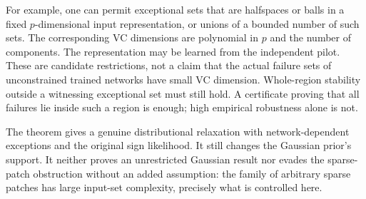 For example, one can permit exceptional sets that are halfspaces or balls
in a fixed $p$-dimensional input representation, or unions of a bounded
number of such sets. The corresponding VC dimensions are polynomial in
$p$ and the number of components. The representation may be learned from
the independent pilot. These are candidate restrictions, not a claim that
the actual failure sets of unconstrained trained networks have small VC
dimension. Whole-region stability outside a witnessing exceptional set
must still hold. A certificate proving that all failures lie inside such
a region is enough; high empirical robustness alone is not.

The theorem gives a genuine distributional relaxation with
network-dependent exceptions and the original sign likelihood. It still
changes the Gaussian prior's support. It neither proves an unrestricted
Gaussian result nor evades the sparse-patch obstruction without an added
assumption: the family of arbitrary sparse patches has large input-set
complexity, precisely what is controlled here.
